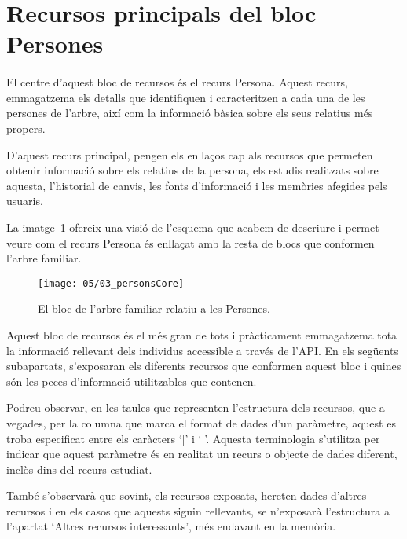 \section{Recursos principals del bloc Persones}\label{sec:persons}

    \paragraph{}
    El centre d'aquest bloc de recursos és el recurs Persona. Aquest recurs, emmagatzema els detalls que identifiquen i caracteritzen a cada una de les persones de l'arbre, així com la informació bàsica sobre els seus relatius més propers.

    D'aquest recurs principal, pengen els enllaços cap als recursos que permeten obtenir informació sobre els relatius de la persona, els estudis realitzats sobre aquesta, l'historial de canvis, les fonts d'informació i les memòries afegides pels usuaris.

    La imatge~\ref{img:personsBloc} ofereix una visió de l'esquema que acabem de descriure i permet veure com el recurs Persona és enllaçat amb la resta de blocs que conformen l'arbre familiar.

    \begin{figure}[h]
        \texttt{[image: 05/03\_personsCore]}
        \centering
        \caption{El bloc de l'arbre familiar relatiu a les Persones.}\label{img:personsBloc}
    \end{figure}

    Aquest bloc de recursos és el més gran de tots i pràcticament emmagatzema tota la informació rellevant dels individus accessible a través de l'API. En els següents subapartats, s'exposaran els diferents recursos que conformen aquest bloc i quines són les peces d'informació utilitzables que contenen.

    Podreu observar, en les taules que representen l'estructura dels recursos, que a vegades, per la columna que marca el format de dades d'un paràmetre, aquest es troba especificat entre els caràcters `[' i `]'. Aquesta terminologia s'utilitza per indicar que aquest paràmetre és en realitat un recurs o objecte de dades diferent, inclòs dins del recurs estudiat.

    També s'observarà que sovint, els recursos exposats, hereten dades d'altres recursos i en els casos que aquests siguin rellevants, se n'exposarà l'estructura a l'apartat `Altres recursos interessants', més endavant en la memòria.

    
    
    
    
    
    
    
    
    
